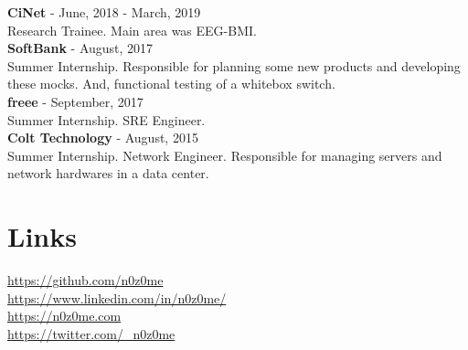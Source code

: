 \documentclass[11pt]{article} %
\begin{document}
\begin{paracol}{2}
\textbf{\color{subtitle}CiNet} \hspace{0.5mm} {\color{subtitle} - June, 2018 - March, 2019}\\
Research Trainee. Main area was EEG-BMI.\\

\textbf{\color{subtitle}SoftBank} \hspace{0.5mm} {\color{subtitle} - August, 2017}\\
Summer Internship. Responsible for planning some new products and developing these mocks. 
And, functional testing of a whitebox switch.\\

\textbf{\color{subtitle}freee} \hspace{0.5mm} {\color{subtitle} - September, 2017}\\
Summer Internship. SRE Engineer. \\

\textbf{\color{subtitle}Colt Technology} \hspace{0.5mm} {\color{subtitle} - August, 2015}\\
Summer Internship. Network Engineer. Responsible for managing servers and network hardwares in a data center.\\


\vspace{0.5cm}


\section{Links}
{\faGithub} \hspace{1mm} \href{https://github.com/n0z0me}{https://github.com/n0z0me}\\ %
{\faLinkedinSquare} \hspace{1mm} \href{https://www.linkedin.com/in/n0z0me/}{https://www.linkedin.com/in/n0z0me/}\\ %
{\small\faDesktop} \hspace{0.8mm} \href{https://n0z0me.com}{https://n0z0me.com}\\ %
{\faTwitterSquare} \hspace{1mm} \href{https://twitter.com/\_n0z0me}{https://twitter.com/\_n0z0me}\\

\end{paracol}

\end{document}
